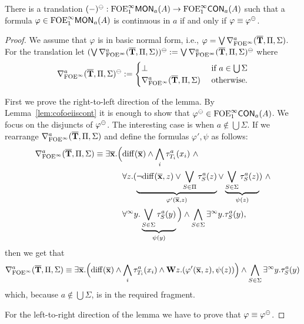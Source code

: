 \begin{lemma}\label{lem:ofoeictrans}
	There is a translation $(-)^\tcont:\monot{\ofoei}{a}(A) \to \cont{\ofoei}{a}(A)$ such that
a formula $\varphi \in \monot{\ofoei}{a}(A)$ is continuous in $a$ if and only if $\varphi\equiv \varphi^\tcont$.
\end{lemma}
\begin{proof} We assume that $\varphi$ is in basic normal form, i.e., $\varphi = \bigvee \mondbnfofoei{\vlist{T}}{\Pi}{\Sigma}{a}$.
For the translation let $(\bigvee \mondbnfofoei{\vlist{T}}{\Pi}{\Sigma}{a})^\tcont := \bigvee \mondbnfofoei{\vlist{T}}{\Pi}{\Sigma}{a}^\tcont$ where
\[
\mondbnfofoei{\vlist{T}}{\Pi}{\Sigma}{a}^\tcont :=
\begin{cases}
	\bot &\text{ if } a\in \bigcup \Sigma\\
	\mondbnfofoei{\vlist{T}}{\Pi}{\Sigma}{a} &\text{ otherwise}.
\end{cases}
\]

First we prove the right-to-left direction of the lemma. By Lemma~\ref{lem:cofoeiiscont} it is enough to show that $\varphi^\tcont \in \cont{\ofoei}{a}(A)$. We focus on the disjuncts of $\varphi^\tcont$. The interesting case is when $a\notin \bigcup \Sigma$. If we rearrange $\mondbnfofoei{\vlist{T}}{\Pi}{\Sigma}{a}$ and define the formulas $\varphi', \psi$ as follows:
%
\begin{align*}
\mondbnfofoei{\vlist{T}}{\Pi}{\Sigma}{a} \equiv \exists \vlist{x}.\Big(& \arediff{\vlist{x}} \land \bigwedge_i \tau^a_{T_i}(x_i)\ \land \\
& \forall z.(\underbrace{\lnot\arediff{\vlist{x},z} \lor \bigvee_{S\in \Pi} \tau^a_S(z)}_{\varphi'(\vlist{x},z)} \lor \underbrace{\bigvee_{S\in \Sigma} \tau^a_S(z)}_{\psi(z)})\ \land \\
& \dqu y.\underbrace{\bigvee_{S\in\Sigma} \tau^a_S(y)}_{\psi(y)} \Big) \land \bigwedge_{S\in\Sigma} \qu y.\tau^a_S(y),
\end{align*}
%
then we get that
{\small
\[
\mondbnfofoei{\vlist{T}}{\Pi}{\Sigma}{a} \equiv \exists \vlist{x}.\Big(\arediff{\vlist{x}} \land \bigwedge_i \tau^a_{T_i}(x_i) \land \wqu z.(\varphi'(\vlist{x},z),\psi(z)) \Big) \land \bigwedge_{S\in\Sigma} \qu y.\tau^a_S(y)
\]}
%
which, because $a\notin \bigcup \Sigma$, is in the required fragment.

For the left-to-right direction of the lemma we have to prove that $\varphi \equiv \varphi^\tcont$.


\end{proof}
